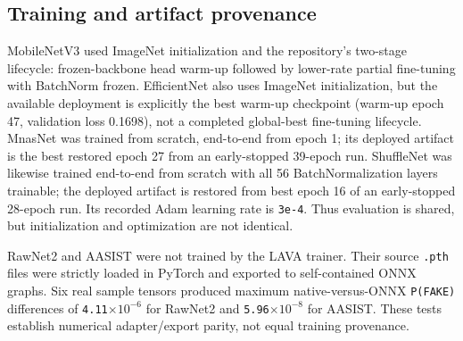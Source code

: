 \documentclass[10pt,journal,onecolumn]{IEEEtran}
\begin{document}
\subsection{Training and artifact provenance}
MobileNetV3 used ImageNet initialization and the repository's two-stage lifecycle: frozen-backbone head warm-up followed by lower-rate partial fine-tuning with BatchNorm frozen. EfficientNet also uses ImageNet initialization, but the available deployment is explicitly the best warm-up checkpoint (warm-up epoch 47, validation loss 0.1698), not a completed global-best fine-tuning lifecycle. MnasNet was trained from scratch, end-to-end from epoch 1; its deployed artifact is the best restored epoch 27 from an early-stopped 39-epoch run. ShuffleNet was likewise trained end-to-end from scratch with all 56 BatchNormalization layers trainable; the deployed artifact is restored from best epoch 16 of an early-stopped 28-epoch run. Its recorded Adam learning rate is \texttt{3e-4}. Thus evaluation is shared, but initialization and optimization are not identical.

RawNet2 and AASIST were not trained by the LAVA trainer. Their source \texttt{.pth} files were strictly loaded in PyTorch and exported to self-contained ONNX graphs. Six real sample tensors produced maximum native-versus-ONNX \texttt{P(FAKE)} differences of \texttt{4.11$\times 10^{-6}$} for RawNet2 and \texttt{5.96$\times 10^{-8}$} for AASIST. These tests establish numerical adapter/export parity, not equal training provenance.
\end{document}
